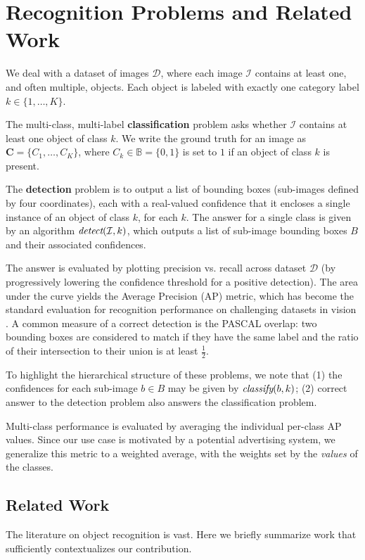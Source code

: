\section{Recognition Problems and Related Work}

We deal with a dataset of images $\mathcal{D}$, where each image $\mathcal{I}$ contains at least one, and often multiple, objects.
Each object is labeled with exactly one category label $k \in \{1, \dots, K\}$.

The multi-class, multi-label \textbf{classification} problem asks whether $\mathcal{I}$ contains at least one object of class $k$.
We write the ground truth for an image as $\mathbf{C}=\{C_1,\dots,C_K\}$, where $C_k \in \mathbb{B} = \{0,1\}$ is set to $1$ if an object of class $k$ is present.

The \textbf{detection} problem is to output a list of bounding boxes (sub-images defined by four coordinates), each with a real-valued confidence that it encloses a single instance of an object of class $k$, for each $k$.
The answer for a single class is given by an algorithm $\emph{detect}(\mathcal{I},k)$, which outputs a list of sub-image bounding boxes $B$ and their associated confidences.

The answer is evaluated by plotting precision vs. recall across dataset $\mathcal{D}$ (by progressively lowering the confidence threshold for a positive detection).
The area under the curve yields the Average Precision (AP) metric, which has become the standard evaluation for recognition performance on challenging datasets in vision \cite{pascal-voc-2010}.
A common measure of a correct detection is the PASCAL overlap: two bounding boxes are considered to match if they have the same label and the ratio of their intersection to their union is at least $\frac{1}{2}$.

To highlight the hierarchical structure of these problems, we note that (1) the confidences for each sub-image $b \in B$ may be given by $\emph{classify}(b,k)$; (2) correct answer to the detection problem also answers the classification problem.

Multi-class performance is evaluated by averaging the individual per-class AP values.
Since our use case is motivated by a potential advertising system, we generalize this metric to a weighted average, with the weights set by the \emph{values} of the classes.

\subsection{Related Work}
The literature on object recognition is vast.
Here we briefly summarize work that sufficiently contextualizes our contribution.

